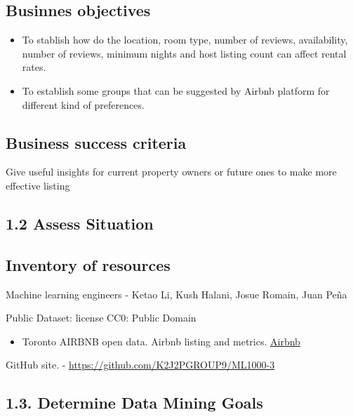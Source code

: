 \hypertarget{businnes-objectives}{%
\subsection{Businnes objectives}\label{businnes-objectives}}

\begin{itemize}
\item
  To stablish how do the location, room type, number of reviews,
  availability, number of reviews, minimum nights and host listing count
  can affect rental rates.
\item
  To establish some groups that can be suggested by Airbnb platform for
  different kind of preferences.
\end{itemize}

\hypertarget{business-success-criteria}{%
\subsection{Business success criteria}\label{business-success-criteria}}

Give useful insights for current property owners or future ones to make
more effective listing

\hypertarget{assess-situation}{%
\subsection{1.2 Assess Situation}\label{assess-situation}}

\hypertarget{inventory-of-resources}{%
\subsection{Inventory of resources}\label{inventory-of-resources}}

Machine learning engineers - Ketao Li, Kush Halani, Josue Romain, Juan
Peña

Public Dataset: license CC0: Public Domain

\begin{itemize}
\tightlist
\item
  Toronto AIRBNB open data. Airbnb listing and metrics.
  \href{http://insideairbnb.com/get-the-data.html}{Airbnb}
\end{itemize}

GitHub site. - \url{https://github.com/K2J2PGROUP9/ML1000-3}

\hypertarget{determine-data-mining-goals}{%
\subsection{1.3. Determine Data Mining
Goals}\label{determine-data-mining-goals}}

